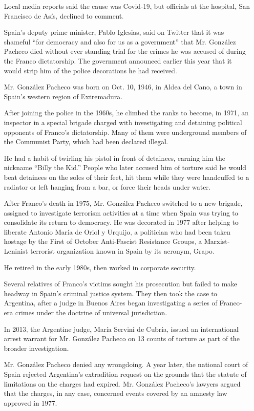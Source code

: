 Local media reports said the cause was Covid-19, but officials at the
hospital, San Francisco de Asís, declined to comment.

Spain's deputy prime minister, Pablo Iglesias, said on Twitter that it
was shameful ``for democracy and also for us as a government'' that Mr.
González Pacheco died without ever standing trial for the crimes he was
accused of during the Franco dictatorship. The government announced
earlier this year that it would strip him of the police decorations he
had received.

Mr. González Pacheco was born on Oct. 10, 1946, in Aldea del Cano, a
town in Spain's western region of Extremadura.

After joining the police in the 1960s, he climbed the ranks to become,
in 1971, an inspector in a special brigade charged with investigating
and detaining political opponents of Franco's dictatorship. Many of them
were underground members of the Communist Party, which had been declared
illegal.

He had a habit of twirling his pistol in front of detainees, earning him
the nickname ``Billy the Kid.'' People who later accused him of torture
said he would beat detainees on the soles of their feet, hit them while
they were handcuffed to a radiator or left hanging from a bar, or force
their heads under water.

After Franco's death in 1975, Mr. González Pacheco switched to a new
brigade, assigned to investigate terrorism activities at a time when
Spain was trying to consolidate its return to democracy. He was
decorated in 1977 after helping to liberate Antonio María de Oriol y
Urquijo, a politician who had been taken hostage by the First of October
Anti-Fascist Resistance Groups, a Marxist-Leninist terrorist
organization known in Spain by its acronym, Grapo.

He retired in the early 1980s, then worked in corporate security.

Several relatives of Franco's victims sought his prosecution but failed
to make headway in Spain's criminal justice system. They then took the
case to Argentina, after a judge in Buenos Aires began investigating a
series of Franco-era crimes under the doctrine of universal
jurisdiction.

In 2013, the Argentine judge, María Servini de Cubría, issued an
international arrest warrant for Mr. González Pacheco on 13 counts of
torture as part of the broader investigation.

Mr. González Pacheco denied any wrongdoing. A year later, the national
court of Spain rejected Argentina's extradition request on the grounds
that the statute of limitations on the charges had expired. Mr. González
Pacheco's lawyers argued that the charges, in any case, concerned events
covered by an amnesty law approved in 1977.

